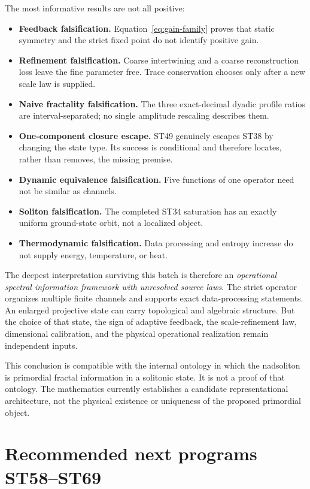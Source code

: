 \documentclass[11pt,a4paper]{article}
\begin{document}
The most informative results are not all positive:
\begin{itemize}
\item \textbf{Feedback falsification.} Equation~\eqref{eq:gain-family} proves that static symmetry and the strict fixed point do not identify positive gain.
\item \textbf{Refinement falsification.} Coarse intertwining and a coarse reconstruction loss leave the fine parameter free. Trace conservation chooses only after a new scale law is supplied.
\item \textbf{Naive fractality falsification.} The three exact-decimal dyadic profile ratios are interval-separated; no single amplitude rescaling describes them.
\item \textbf{One-component closure escape.} ST49 genuinely escapes ST38 by changing the state type. Its success is conditional and therefore locates, rather than removes, the missing premise.
\item \textbf{Dynamic equivalence falsification.} Five functions of one operator need not be similar as channels.
\item \textbf{Soliton falsification.} The completed ST34 saturation has an exactly uniform ground-state orbit, not a localized object.
\item \textbf{Thermodynamic falsification.} Data processing and entropy increase do not supply energy, temperature, or heat.
\end{itemize}

The deepest interpretation surviving this batch is therefore an \emph{operational spectral information framework with unresolved source laws}. The strict operator organizes multiple finite channels and supports exact data-processing statements. An enlarged projective state can carry topological and algebraic structure. But the choice of that state, the sign of adaptive feedback, the scale-refinement law, dimensional calibration, and the physical operational realization remain independent inputs.

This conclusion is compatible with the internal ontology in which the nadsoliton is primordial fractal information in a solitonic state. It is not a proof of that ontology. The mathematics currently establishes a candidate representational architecture, not the physical existence or uniqueness of the proposed primordial object.

\section{Recommended next programs ST58--ST69}
\end{document}
